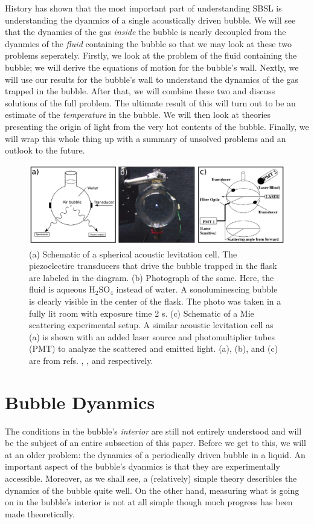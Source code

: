 \documentclass[rmp,aps,nofootinbib,superscriptaddress,floatfix,10pt]{revtex4-2}
\begin{document}
History has shown that the most important part of understanding SBSL is understanding the dyanmics of a single acoustically driven bubble. We will see that the dynamics of the gas \emph{inside} the bubble is nearly decoupled from the dyanmics of the \emph{fluid} containing the bubble so that we may look at these two problems seperately. Firstly, we look at the problem of the fluid containing the bubble; we will derive the equations of motion for the bubble's wall. Nextly, we will use our results for the bubble's wall to understand the dynamics of the gas trapped in the bubble. After that, we will combine these two and discuss solutions of the full problem. The ultimate result of this will turn out to be an estimate of the \emph{temperature} in the bubble. We will then look at theories presenting the origin of light from the very hot contents of the bubble. Finally, we will wrap this whole thing up with a summary of unsolved problems and an outlook to the future.

\begin{figure}
\includegraphics[width=0.9\linewidth]{figs/flask.pdf}
    \caption{(a) Schematic of a spherical acoustic levitation cell. The piezoelectirc transducers that drive the bubble trapped in the flask are labeled in the diagram. (b) Photograph of the same. Here, the fluid is aqueous H$_2$SO$_4$ instead of water. A sonoluminescing bubble is clearly visible in the center of the flask. The photo was taken in a fully lit room with exposure time 2 s. (c) Schematic of a Mie scattering experimental setup. A similar acoustic levitation cell as (a) is shown with an added laser source and photomultiplier tubes (PMT) to analyze the scattered and emitted light. (a), (b), and (c) are from refs. \cite{brenner2002single}, \cite{suslick2008inside}, and \cite{gompf2000mie} respectively.}
\label{fig:flask}
\end{figure}


\section{Bubble Dyanmics}
The conditions in the bubble's \emph{interior} are still not entirely understood and will be the subject of an entire subsection of this paper. Before we get to this, we will at an older problem: the dynamics of a periodically driven bubble in a liquid. An important aspect of the bubble's dyanmics is that they are experimentally accessible. Moreover, as we shall see, a (relatively) simple theory describles the dynamics of the bubble quite well. On the other hand, measuring what is going on in the bubble's interior is not at all simple though much progress has been made theoretically. 
 
\end{document}
